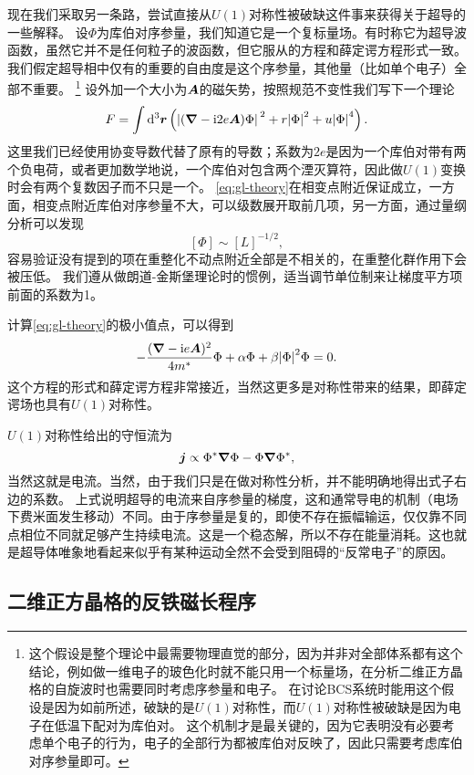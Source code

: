 \documentclass[hyperref, UTF8, a4paper]{ctexart}
\newcommand*{\ii}{\mathrm{i}}
\begin{document}
现在我们采取另一条路，尝试直接从$U(1)$对称性被破缺这件事来获得关于超导的一些解释。
设$\Phi$为库伯对序参量，我们知道它是一个复标量场。有时称它为超导波函数，虽然它并不是任何粒子的波函数，但它服从的方程和薛定谔方程形式一致。
我们假定超导相中仅有的重要的自由度是这个序参量，其他量（比如单个电子）全部不重要。%
\footnote{这个假设是整个理论中最需要物理直觉的部分，因为并非对全部体系都有这个结论，例如做一维电子的玻色化时就不能只用一个标量场，在分析二维正方晶格的自旋波时也需要同时考虑序参量和电子。
在讨论BCS系统时能用这个假设是因为如前所述，破缺的是$U(1)$对称性，而$U(1)$对称性被破缺是因为电子在低温下配对为库伯对。
这个机制才是最关键的，因为它表明没有必要考虑单个电子的行为，电子的全部行为都被库伯对反映了，因此只需要考虑库伯对序参量即可。}%
设外加一个大小为$\vb*{A}$的磁矢势，按照规范不变性我们写下一个理论
\begin{equation}
    F = \int \dd[3]{\vb*{r}} \left( \abs*{(\grad - \ii 2 e \vb*{A}) \Phi}^2 + r \abs{\Phi}^2 + u\abs{\Phi}^4 \right).
    \label{eq:gl-theory}
\end{equation}
这里我们已经使用协变导数代替了原有的导数；系数为$2e$是因为一个库伯对带有两个负电荷，或者更加数学地说，一个库伯对包含两个湮灭算符，因此做$U(1)$变换时会有两个复数因子而不只是一个。
\eqref{eq:gl-theory}在相变点附近保证成立，一方面，相变点附近库伯对序参量不大，可以级数展开取前几项，另一方面，通过量纲分析可以发现
\[
    [\Phi] \sim [L]^{-1/2},
\]
容易验证没有提到的项在重整化不动点附近全部是不相关的，在重整化群作用下会被压低。
我们遵从做朗道-金斯堡理论时的惯例，适当调节单位制来让梯度平方项前面的系数为1。

计算\eqref{eq:gl-theory}的极小值点，可以得到
\begin{equation}
    - \frac{(\grad - \ii e \vb*{A})^2}{4 m^*} \Phi + \alpha \Phi + \beta \abs{\Phi}^2 \Phi = 0.
\end{equation}
这个方程的形式和薛定谔方程非常接近，当然这更多是对称性带来的结果，即薛定谔场也具有$U(1)$对称性。

$U(1)$对称性给出的守恒流为
\begin{equation}
    \vb*{j} \propto \Phi^* \grad{\Phi} - \Phi \grad{\Phi^*},
\end{equation}
当然这就是电流。当然，由于我们只是在做对称性分析，并不能明确地得出式子右边的系数。
上式说明超导的电流来自序参量的梯度，这和通常导电的机制（电场下费米面发生移动）不同。由于序参量是复的，即使不存在振幅输运，仅仅靠不同点相位不同就足够产生持续电流。这是一个稳态解，所以不存在能量消耗。这也就是超导体唯象地看起来似乎有某种运动全然不会受到阻碍的“反常电子”的原因。

\subsection{二维正方晶格的反铁磁长程序}
\end{document}
